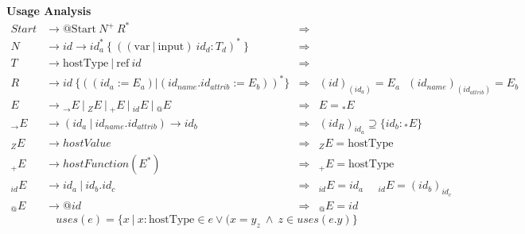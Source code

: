 \begin{figure*}
\begin{center}
\textbf{Usage Analysis}
\begin{align*}
Start &  \rightarrow  \text{@Start}~ N^{+} ~ R^{*} & \Rightarrow & \\
N &  \rightarrow  id \rightarrow id_{a}^{*} ~ \{ ~ ((\text{var} ~ | ~ \text{input})~ id_d : T_d )^{*} ~ \} & \Rightarrow & \\
T &  \rightarrow  \text{hostType} ~|~ \text{ref}~id & \Rightarrow & \\
R &  \rightarrow  id ~ \{ ((id_a := E_a) | (id_{name}.id_{attrib} := E_b))^{*} \} & \Rightarrow & (id)_{(id_a)} = E_a ~~~ ({id_{name}})_{(id_{attrib})} = E_b\\
E &  \rightarrow {_{\rightarrow}E} ~|~ _{Z}E ~|~ _{+}E ~|~ _{id}E  ~|~ {_@}E & \Rightarrow & E = {_{*}}E\\
_{\rightarrow}E &  \rightarrow (id_a ~|~ id_{name}.id_{attrib}) \rightarrow id_b & \Rightarrow & (id_R)_{id_a} \supseteq \{id_b : {_{*}}E \} \\
_{Z}E &  \rightarrow hostValue & \Rightarrow & _{Z}E = \text{hostType} \\
_{+}E &  \rightarrow hostFunction(E^{*}) & \Rightarrow & _{+}E = \text{hostType}\\
_{id}E &  \rightarrow id_a ~|~ id_b.id_c & \Rightarrow & _{id}E = id_a ~~~~~~ _{id}E = (id_b)_{id_c} \\
_{@}E & \rightarrow @id & \Rightarrow & {_@}E = id
\end{align*}
$$uses(e) = \{ x ~|~ x : \text{hostType} \in e \vee (x = y_z ~ \wedge ~ z \in uses(e.y) \}$$


\end{center}
\end{figure*}
